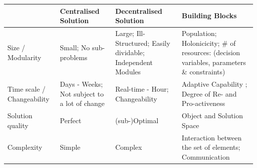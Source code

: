 \begin{tabular}{p{2cm}|p{3cm}|p{3cm}|p{3cm}}
	& Centralised Solution & Decentralised Solution & Building Blocks\\
	\hline \hline
	Size / Modularity & Small;  No sub-problems & Large; Ill-Structured; Easily dividable; Independent Modules & Population; Holonicicity; \# of resources: (decision variables, parameters \& constraints)\\
	\hline
	Time scale / Changeability & Days - Weeks; Not subject to a lot of change & Real-time - Hour; Changeability  & Adaptive Capability ; Degree of Re- and Pro-activeness\\
	\hline
	Solution quality & Perfect & (sub-)Optimal & Object and Solution Space\\
	\hline
	Complexity & Simple & Complex & Interaction between the set of elements; Communication
\end{tabular}
